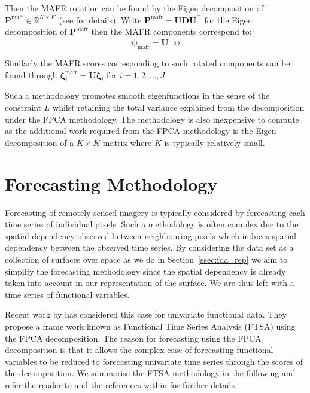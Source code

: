 \documentclass{article}
\newcommand{\ve}[1]{\bm{{#1}}}
\begin{document}
Then the MAFR rotation can be found by the Eigen decomposition of $\ve{P}^\text{mafr} \in \mathbb{R}^{K \times K}$ (see \citet{hooker_maximal_2016} for details). Write $\ve{P}^\text{mafr} = \ve{U} \ve{D} \ve{U}^\top$ for the Eigen decomposition of $\ve{P}^\text{mafr}$ then the MAFR components correspond to:
\begin{equation}
  \ve{\psi}_\text{mafr} = \ve{U}^\top \ve{\psi}
  \label{eqn:mafr_rot}
\end{equation}

Similarly the MAFR scores corresponding to such rotated components can be found through $\ve{\zeta}^\text{mafr}_i = \ve{U} \ve{\zeta}_i$ for $i=1,2,\dots,J$.

Such a methodology promotes smooth eigenfunctions in the sense of the constraint $L$ whilst retaining the total variance explained from the decomposition under the FPCA methodology. The methodology is also inexpensive to compute as the additional work required from the FPCA methodology is the Eigen decomposition of a $K \times K$ matrix where $K$ is typically relatively small.

\section{\label{sec:forecasting}Forecasting Methodology}
Forecasting of remotely sensed imagery is typically considered by forecasting each time series of individual pixels. Such a methodology is often complex due to the spatial dependency observed between neighbouring pixels which induces spatial dependency between the observed time series. By considering the data set as a collection of surfaces over space as we do in Section~\ref{ssec:fda_rep} we aim to simplify the forecasting methodology since the spatial dependency is already taken into account in our representation of the surface. We are thus left with a time series of functional variables. 

Recent work by \citet{shang_ftsa_2013} has considered this case for univariate functional data. They propose a frame work known as Functional Time Series Analysis (FTSA) using the FPCA decomposition. The reason for forecasting using the FPCA decomposition is that it allows the complex case of forecasting functional variables to be reduced to forecasting univariate time series through the scores of the decomposition. We summarise the FTSA methodology in the following and refer the reader to \citet{shang_ftsa_2013} and the references within for further details. 
\end{document}
